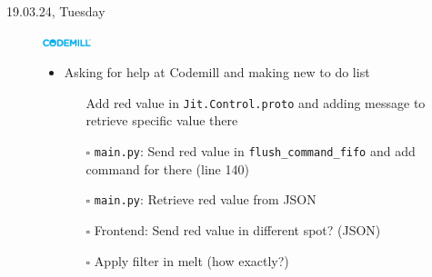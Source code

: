 \documentclass[a4, 11pt]{scrartcl}
\newcommand{\cmark}{\ding{51}}%
\newcommand{\done}{\rlap{$\square$}{\raisebox{2pt}{\large\hspace{1pt}\cmark}}%
	\hspace{-2.5pt}}
\begin{document}
\begin{description}
	
	
	
	\item[19.03.24, Tuesday]
	\includegraphics[width=1.4cm]{codemill.png}
	\begin{itemize}
		\item Asking for help at Codemill and making new to do list
		\begin{itemize}
			\item[\done] Add red value in \texttt{Jit.Control.proto} and adding message to retrieve specific value there
			\item[$\square$] \texttt{main.py}: Send red value in \texttt{flush\_command\_fifo} and add command for there (line 140)
			\item[$\square$] \texttt{main.py}: Retrieve red value from JSON
			\item[$\square$] Frontend: Send red value in different spot? (JSON)
			\item[$\square$] Apply filter in melt (how exactly?)
		\end{itemize}
	\end{itemize}
	
	
	
	
	
	
	
	
	
	
	
	
\end{description}	


	
	
	
	
\end{document}
